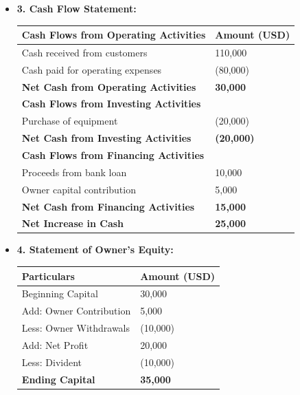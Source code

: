 \documentclass[12pt,a4paper]{book}
\begin{document}
\begin{itemize}
    \vspace{0.5cm}
    \item \textbf{3. Cash Flow Statement:}

    \begin{tabular}{|p{10cm}|p{5cm}|}
    \hline
    \textbf{Cash Flows from Operating Activities} & \textbf{Amount (USD)} \\
    \hline
    Cash received from customers & 110,000 \\
    Cash paid for operating expenses & (80,000) \\
    \textbf{Net Cash from Operating Activities} & \textbf{30,000} \\
    \hline
    \textbf{Cash Flows from Investing Activities} & \\
    \hline
    Purchase of equipment & (20,000) \\
    \textbf{Net Cash from Investing Activities} & \textbf{(20,000)} \\
    \hline
    \textbf{Cash Flows from Financing Activities} & \\
    \hline
    Proceeds from bank loan & 10,000 \\
    Owner capital contribution & 5,000 \\
    \textbf{Net Cash from Financing Activities} & \textbf{15,000} \\
    \hline
    \textbf{Net Increase in Cash} & \textbf{25,000} \\
    \hline
    \end{tabular}

    \vspace{0.5cm}
    \item \textbf{4. Statement of Owner’s Equity:}

    \begin{tabular}{|p{8cm}|p{5cm}|}
    \hline
    \textbf{Particulars} & \textbf{Amount (USD)} \\
    \hline
    Beginning Capital & 30,000 \\
    
    Add: Owner Contribution & 5,000 \\
    Less: Owner Withdrawals & (10,000) \\
    Add: Net Profit & 20,000 \\
    Less: Divident & (10,000) \\
    \hline
    \textbf{Ending Capital} & \textbf{35,000} \\
    \hline
    \end{tabular}

\end{itemize}
\end{document}
